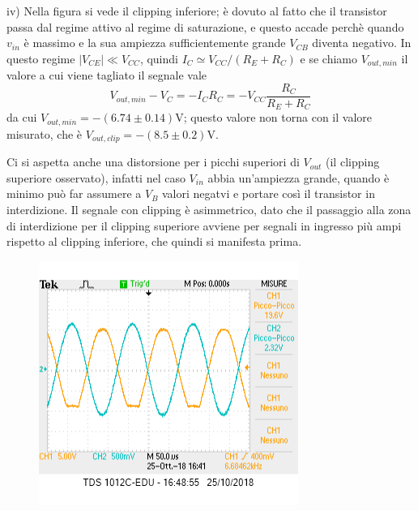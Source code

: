 \documentclass[10pt,a4paper]{article}
\begin{document}
iv) Nella figura si vede il clipping inferiore; è dovuto al fatto che il transistor passa dal regime attivo al regime di saturazione, e questo accade perchè quando $v_{in}$ è massimo e la sua ampiezza sufficientemente grande $ V_{CB}$ diventa negativo.
In questo regime $|V_{CE}|\ll  V_{CC}$, quindi $ I_C \simeq V_{CC}/(R_E+R_C)$ e  se chiamo $V_{out,min}$ il valore a cui viene tagliato il segnale vale \[V_{out,min} -V_C= - I_C R_C = - V_{CC}\frac{R_C}{R_E+R_C}\]
da cui 
$V_{out,min} = -(6.74\pm 0.14) \si{\volt}$; questo valore non torna con il valore misurato, che è $V_{out,clip} = -(8.5\pm 0.2) \si{\volt}$.

Ci si aspetta anche una distorsione per i picchi superiori di $V_{out}$ (il clipping superiore osservato), infatti nel caso   $V_{in}$ abbia un'ampiezza grande, quando è minimo può far assumere a  $V_{B}$ valori negatvi e portare così il transistor in interdizione.
Il segnale con clipping è asimmetrico, dato che il passaggio alla zona di interdizione per il clipping superiore avviene per segnali in ingresso più ampi rispetto al clipping inferiore, che quindi si manifesta prima.

\begin{figure}[h]
	\centering
	\includegraphics[scale=0.5]{clipping.png}
	\label{Clipping osservato (inferiore e superiore)}
\end{figure}
\end{document}
